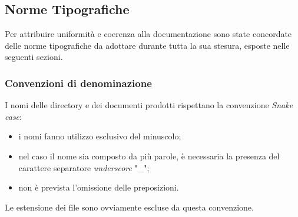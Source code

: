 \subsection{Norme Tipografiche}\label{3.1.8}
\label{sec:NormeTipografiche}
Per attribuire uniformità e coerenza alla documentazione sono state concordate  delle norme tipografiche da adottare durante tutta la sua stesura, esposte nelle seguenti sezioni.
\subsubsection{Convenzioni di denominazione}\label{3.1.8.1}
I nomi delle directory e dei documenti prodotti rispettano la convenzione \textit{Snake case}:%
\begin{itemize}
  \item i nomi fanno utilizzo esclusivo del minuscolo;
  \item nel caso il nome sia composto da più parole, è necessaria la presenza del carattere separatore \textit{underscore} "\_";
  \item non è prevista l'omissione delle preposizioni.
\end{itemize}
Le estensione dei file sono ovviamente escluse da questa convenzione.
